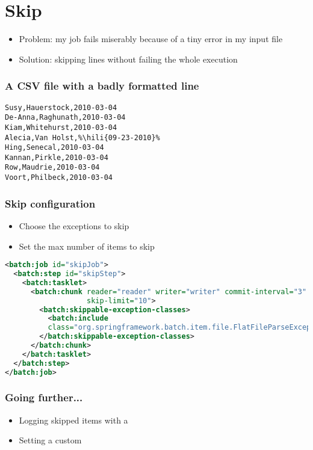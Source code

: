 \section{Skip}

\begin{frame}
 \begin{itemize}
  \item Problem: my job fails miserably because of a tiny error in my input file
  \item Solution: skipping lines without failing the whole execution
 \end{itemize}
\end{frame}

\begin{frame}[fragile]
 \frametitle{A CSV file with a badly formatted line}
 
\begin{lstlisting}
Susy,Hauerstock,2010-03-04
De-Anna,Raghunath,2010-03-04
Kiam,Whitehurst,2010-03-04
Alecia,Van Holst,%\hili{09-23-2010}%
Hing,Senecal,2010-03-04
Kannan,Pirkle,2010-03-04
Row,Maudrie,2010-03-04
Voort,Philbeck,2010-03-04
\end{lstlisting}
 
\end{frame}

\begin{frame}[fragile]
 \frametitle{Skip configuration}
 \begin{itemize}
  \item Choose the exceptions to skip
  \item Set the max number of items to skip
 \end{itemize}

 \begin{lstlisting}[language=XML]
<batch:job id="skipJob">
  <batch:step id="skipStep">
    <batch:tasklet>
      <batch:chunk reader="reader" writer="writer" commit-interval="3"
                   skip-limit="10">
        <batch:skippable-exception-classes>
          <batch:include
          class="org.springframework.batch.item.file.FlatFileParseException"/>
        </batch:skippable-exception-classes>
      </batch:chunk>
    </batch:tasklet>
  </batch:step>
</batch:job>
\end{lstlisting}

\end{frame}

\begin{frame}
 \frametitle{Going further...}
 \begin{itemize} 
  \item Logging skipped items with a 
  \item Setting a custom 
 \end{itemize}
\end{frame}